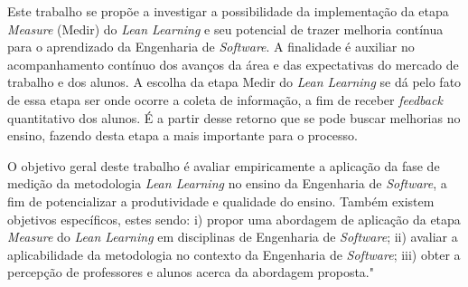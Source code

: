 
Este trabalho se propõe a investigar a possibilidade da implementação da etapa \textit{Measure} (Medir) do \textit{Lean Learning} e seu potencial de trazer melhoria contínua para o aprendizado da Engenharia de \textit{Software}. A finalidade é auxiliar no acompanhamento contínuo dos avanços da área e das expectativas do mercado de trabalho e dos alunos. A escolha da etapa Medir do \textit{Lean Learning} se dá pelo fato de essa etapa ser onde ocorre a coleta de informação, a fim de receber \textit{feedback} quantitativo dos alunos. É a partir desse retorno que se pode buscar melhorias no ensino, fazendo desta etapa a mais importante para o processo.



O objetivo geral deste trabalho é avaliar empiricamente a aplicação da fase de medição da metodologia \textit{Lean Learning} no ensino da Engenharia de \textit{Software}, a fim de potencializar a produtividade e qualidade do ensino. Também existem objetivos específicos, estes sendo: i) propor uma abordagem de aplicação da etapa \textit{Measure} do \textit{Lean Learning} em disciplinas de Engenharia de \textit{Software}; ii) avaliar a aplicabilidade da metodologia no contexto da Engenharia de \textit{Software}; iii) obter a percepção de professores e alunos acerca da abordagem proposta."

